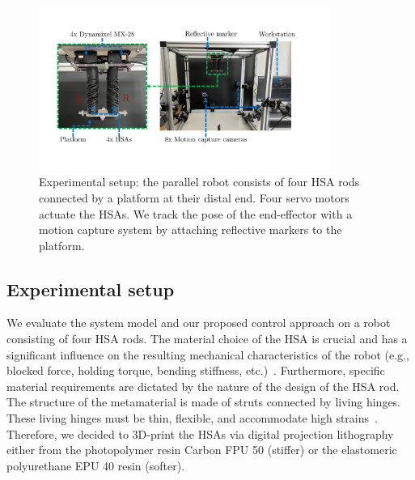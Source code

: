\begin{figure}[t]
    \centering
    \includegraphics[width=0.85\textwidth]{hsacontrol/figures/experimental_setup_v2_cropped_compressed.pdf}
    \caption{Experimental setup: the parallel robot consists of four HSA rods connected by a platform at their distal end. Four servo motors actuate the HSAs. We track the pose of the end-effector with a motion capture system by attaching reflective markers to the platform.}
    \label{fig:hsacontrol:experimental_setup}
\end{figure}

\subsection{Experimental setup}\label{sub:hsacontrol:configuration_space_regulation:experimental_setup}
We evaluate the system model and our proposed control approach on a robot consisting of four HSA rods.
The material choice of the \gls{HSA} is crucial and has a significant influence on the resulting mechanical characteristics of the robot  (e.g., blocked force, holding torque, bending stiffness, etc.)~\citep{truby2021recipe}. Furthermore, specific material requirements are dictated by the nature of the design of the \gls{HSA} rod. The structure of the metamaterial is made of struts connected by living hinges. These living hinges must be thin, flexible, and accommodate high strains~\citep{truby2021recipe}.
Therefore, we decided to 3D-print the \glspl{HSA} via digital projection lithography either from the photopolymer resin Carbon FPU 50 (stiffer) or the elastomeric polyurethane EPU 40 resin (softer).

